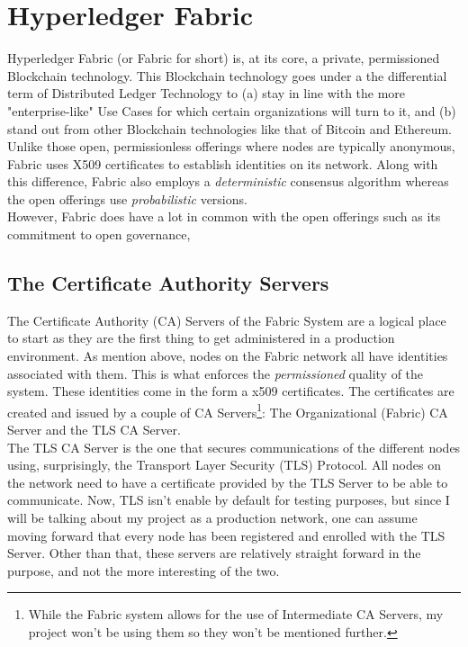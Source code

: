 \section{Hyperledger Fabric}
	\hspace{10mm}Hyperledger Fabric (or Fabric for short) is, at its core, a private, permissioned Blockchain technology. This Blockchain technology goes under a the differential term of Distributed Ledger Technology to (a) stay in line with the more "enterprise-like" Use Cases for which certain organizations will turn to it, and (b) stand out from other Blockchain technologies like that of Bitcoin and Ethereum. Unlike those open, permissionless offerings where nodes are typically anonymous, Fabric uses X509 certificates to establish identities on its network. Along with this difference, Fabric also employs a \textit{deterministic} consensus algorithm whereas the open offerings use \textit{probabilistic} versions.\\
	
	\hspace{10mm}However, Fabric does have a lot in common with the open offerings such as its commitment to open governance, 
		
	\subsection{The Certificate Authority Servers}
		\hspace{10mm}The Certificate Authority (CA) Servers of the Fabric System are a logical place to start as they are the first thing to get administered in a production environment. As mention above, nodes on the Fabric network all have identities associated with them. This is what enforces the \textit{permissioned} quality of the system. These identities come in the form a x509 certificates. The certificates are created and issued by a couple of CA Servers\footnote{While the Fabric system allows for the use of Intermediate CA Servers, my project won't be using them so they won't be mentioned further.}: The Organizational (Fabric) CA Server and the TLS CA Server.\\
		
		\hspace{10mm}The TLS CA Server is the one that secures communications of the different nodes using, surprisingly, the Transport Layer Security (TLS) Protocol. All nodes on the network need to have a certificate provided by the TLS Server to be able to communicate. Now, TLS isn't enable by default for testing purposes, but since I will be talking about my project as a production network, one can assume moving forward that every node has been registered and enrolled with the TLS Server. Other than that, these servers are relatively straight forward in the purpose, and not the more interesting of the two.
		
